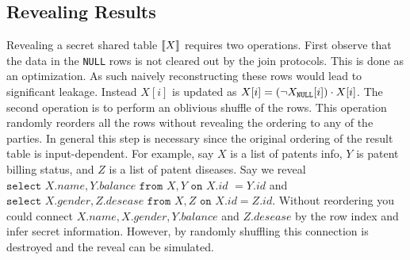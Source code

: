 

\subsection{Revealing Results}

Revealing a secret shared table $\llbracket X\rrbracket$ requires two operations. First observe that the data in the \texttt{NULL} rows is not cleared out by the join protocols. This is done as an optimization. As such naively reconstructing these rows would lead to significant leakage. Instead $X[i]$  is updated as $X[i]=(\neg X_\texttt{NULL}[i])\cdot X[i]$. %
The second operation is to perform an oblivious shuffle of the rows. This operation randomly reorders all the rows without revealing the ordering to any of the parties. In general this step is necessary since the original ordering of the result table is input-dependent. For example, say $X$ is a list of patents info, $Y$ is patent billing status, and $Z$ is a list of patent diseases. Say we reveal $\texttt{select } X.name, Y.balance \texttt{ from } X,Y \texttt{ on } X.id$ $=Y.id$ and $\texttt{select } X.gender, Z.desease \texttt{ from } X,Z \texttt{ on } \allowbreak X.id=Z.id$. Without reordering you could connect $X.name, X.gender, Y.balance$ and $Z.desease$ by the row index and infer secret information. However, by randomly shuffling this connection is destroyed and the reveal can be simulated.

